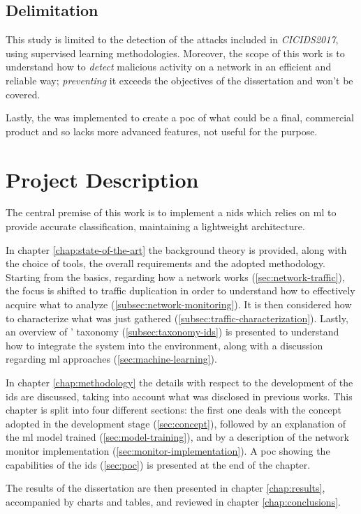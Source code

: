 
\subsection{Delimitation}
\label{subsec:delimitation}

This study is limited to the detection of the attacks included in \textit{CICIDS2017}, using supervised learning methodologies. Moreover, the scope of this work is to understand how to \textit{detect} malicious activity on a network in an efficient and reliable way; \textit{preventing} it exceeds the objectives of the dissertation and won't be covered.
\par Lastly, the  was implemented to create a \gls{poc} of what could be a final, commercial product and so lacks more advanced features, not useful for the purpose.


\section{Project Description}
\label{sec:proj-description}

The central premise of this work is to implement a \gls{nids} which relies on \gls{ml} to provide accurate classification, maintaining a lightweight architecture.
\par In chapter \ref{chap:state-of-the-art} the background theory is provided, along with the choice of tools, the overall requirements and the adopted methodology. Starting from the basics, regarding how a network works (\ref{sec:network-traffic}), the focus is shifted to traffic duplication in order to understand how to effectively acquire what to analyze (\ref{subsec:network-monitoring}). It is then considered how to characterize what was just gathered (\ref{subsec:traffic-characterization}). Lastly, an overview of ' taxonomy (\ref{subsec:taxonomy-ids}) is presented to understand how to integrate the system into the environment, along with a discussion regarding \gls{ml} approaches (\ref{sec:machine-learning}).
\par In chapter \ref{chap:methodology} the details with respect to the development of the \gls{ids} are discussed, taking into account what was disclosed in previous works. This chapter is split into four different sections: the first one deals with the concept adopted in the development stage (\ref{sec:concept}), followed by an explanation of the \gls{ml} model trained (\ref{sec:model-training}), and by a description of the network monitor implementation (\ref{sec:monitor-implementation}). A \gls{poc} showing the capabilities of the \gls{ids} (\ref{sec:poc}) is presented at the end of the chapter. 
\par The results of the dissertation are then presented in chapter \ref{chap:results}, accompanied by charts and tables, and reviewed in chapter \ref{chap:conclusions}. 
